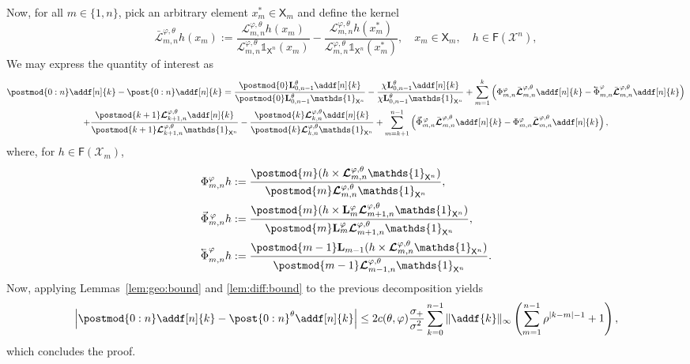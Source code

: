 \documentclass{article}
\newtheorem{lemma}[theorem]{Lemma}
\newcommand{\retrokmodnorm}{\bar{\boldsymbol{\mathcal{L}}}^{\precpar,\theta}}
\newcommand{\xarb}{x^\ast}
\newcommand{\Xfd}{\mathcal{X}}
\newcommand{\cev}[1]{\reflectbox{\ensuremath{\vec{\reflectbox{\ensuremath{#1}}}}}}
\newcommand{\ukmod}[1]{\mathbf{L}_{#1}^\precpar}
\newcommand{\shiftbwd}{\cev{\shiftsymbol}^{\precpar}}
\newcommand{\shiftfwd}{\vec{\shiftsymbol}^{\, \precpar}}
\newcommand{\shiftsymbol}{\Phi}
\newcommand{\precpar}{\varphi}
\newcommand{\intvect}[2]{\{ #1, #2 \}}
\newcommand{\noshift}{\shiftsymbol^{\precpar}}
\newcommand{\udlow}{\sigma_-}
\newcommand{\udup}{\sigma_+}
\newcommand{\1}{\mathbbm{1}}
\newcommand{\retrokmod}{\boldsymbol{\mathcal{L}}^{\precpar,\theta}}
\newcommand{\uk}[1]{\mathbf{L}_{#1}}
\newcommand{\Xset}{\mathsf{X}}
\newcommand{\bmf}[1]{\set{F}(#1)}
\newcommand{\set}[1]{\mathsf{#1}}
\def\1{\mathds{1}}
\newcommand{\eqdef}{\ensuremath{:=}}
\begin{document}
Now, for all $m \in \intvect{1}{n}$, pick an arbitrary element $\xarb_m \in \Xset_m$ and define the kernel 
\begin{equation} \label{eq:def:norm:objective:func}
\retrokmodnorm_{m, n} h(x_m) \eqdef \frac{\retrokmod_{m, n} h(x_m)}{\retrokmod_{m, n} \1_{\Xset^n}(x_m)} - \frac{\retrokmod_{m, n} h (\xarb_m)}{\retrokmod_{m, n} \1_{\Xset^n} (\xarb_m)}, \quad x_m \in \Xset_m, \quad h \in \bmf{\Xfd^n},
\end{equation}
We may express the quantity of interest as 
\begin{multline*}
\postmod{0:n} \addf[n]{k} - \post{0:n} \addf[n]{k} = \frac{\postmod{0} \uk{0, n - 1}^\theta \addf[n]{k}}{\postmod{0} \uk{0, n - 1}^\theta \1_{\Xset^n}} - \frac{\chi \uk{0, n - 1}^\theta \addf[n]{k}}{\chi\uk{0, n - 1}^\theta \1_{\Xset^n}} + \sum_{m = 1}^k \left( \noshift_{m, n} \retrokmodnorm_{m, n} \addf[n]{k} - \shiftbwd_{m, n}  \retrokmodnorm_{m, n} \addf[n]{k} \right) \\ 
+ \frac{\postmod{k + 1} \retrokmod_{k + 1, n} \addf[n]{k}}{\postmod{k + 1} \retrokmod_{k + 1, n} \1_{\Xset^n}} - \frac{\postmod{k} \retrokmod_{k, n} \addf[n]{k}}{\postmod{k} \retrokmod_{k, n} \1_{\Xset^n}} + \sum_{m = k + 1}^{n - 1} \left( \shiftfwd_{m, n} \retrokmodnorm_{m, n} \addf[n]{k} - \noshift_{m, n} \retrokmodnorm_{m, n} \addf[n]{k} \right),
\end{multline*}
where, for $h \in \bmf{\Xfd_m}$, 
\begin{align}
\noshift_{m, n} h &\eqdef \frac{\postmod{m} (h \times \retrokmod_{m, n} \1_{\Xset^n})}{\postmod{m} \retrokmod_{m, n} \1_{\Xset^n}}, \nonumber \\
\shiftfwd_{m, n} h &\eqdef \frac{\postmod{m} (h \times \ukmod{m} \retrokmod_{m + 1, n} \1_{\Xset^n})}{\postmod{m} \ukmod{m} \retrokmod_{m + 1, n} \1_{\Xset^n}}, \nonumber \\
\shiftbwd_{m, n} h &\eqdef \frac{\postmod{m - 1} \uk{m - 1}(h \times \retrokmod_{m, n} \1_{\Xset^n})}{\postmod{m - 1} \retrokmod_{m - 1, n} \1_{\Xset^n}}.  \nonumber 
\end{align}
Now, applying Lemmas~\ref{lem:geo:bound} and \ref{lem:diff:bound} to the previous decomposition yields
$$
\left| \postmod{0:n} \addf[n]{k} - \post{0:n}^\theta \addf[n]{k} \right| \leq 2 c(\theta,\varphi) \frac{\udup }{\udlow^2} \sum_{k = 0}^{n - 1} \| \addf{k} \|_\infty \left( \sum_{m = 1}^{n - 1} \rho^{|k - m| - 1} + 1 \right),
$$
which concludes the proof. 

%
%
%
%
\end{document}
